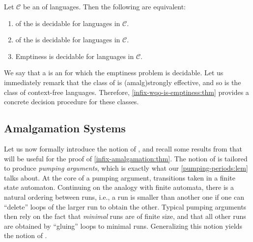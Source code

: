\begin{theorem}[restate=infix-wqo-is-emptiness:thm,label=infix-wqo-is-emptiness:thm]
	Let $\mathcal{C}$ be an  of languages.
    Then the following are equivalent:
	\begin{enumerate}
        \item\label{wqo-infix-decidable}  of the  is decidable for languages in $\mathcal{C}$.
        \item\label{wqo-prefix-decidable}  of the  is decidable for languages in $\mathcal{C}$.
        \item\label{emptiness-decidable} Emptiness is decidable for languages in $\mathcal{C}$.
	\end{enumerate}
\end{theorem}

\AP We say that a  is an
 for which the emptiness problem is decidable.
Let us immediately remark that the class of  is
\kl(amalg){strongly effective}, and so is the class of context-free languages.
Therefore, \cref{infix-wqo-is-emptiness:thm} provides a concrete decision
procedure for these classes.

\subsection{Amalgamation Systems}
\label{amalgamation-systems:subsec}

Let us now formally introduce the notion of , and
recall some results from \cite{ASZZ24} that will be useful for the proof of
\cref{infix-amalgamation:thm}. The notion of  is
tailored to produce \emph{pumping arguments}, which is exactly what our
\cref{pumping-periods:lem} talks about. At the core of a pumping argument,
transitions taken in a finite state automaton. Continuing on the analogy with
finite automata, there is a natural ordering between runs, i.e., a run is
smaller than another one if one can ``delete'' loops of the larger run to obtain
the other. Typical pumping arguments then rely on the fact that
\emph{minimal} runs are of finite size, and that all other runs are
obtained by ``gluing'' loops to minimal runs. Generalizing this notion yields the 
notion of .

